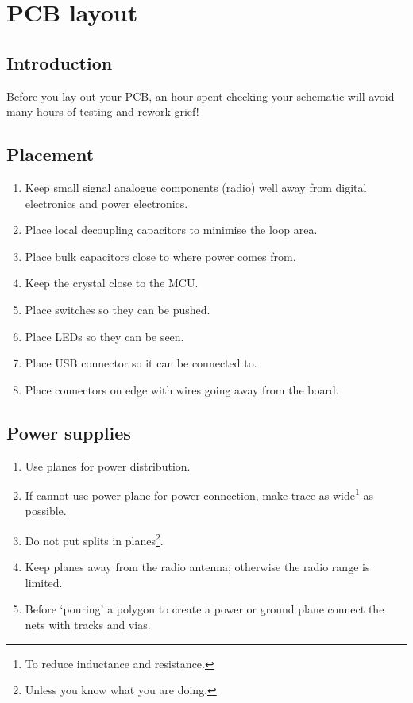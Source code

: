 \chapter{PCB layout}


\section{Introduction}
\label{PCB_introduction}

Before you lay out your PCB, an hour spent checking your schematic
will avoid many hours of testing and rework grief!


\label{pcb-recommendations}

\section{Placement}
\label{placement}

\begin{enumerate}
\item
  Keep small signal analogue components (radio) well away from digital
  electronics and power electronics.
\item
  Place local decoupling capacitors to minimise the loop area.
\item
  Place bulk capacitors close to where power comes from.
\item
  Keep the crystal close to the MCU.
\item
  Place switches so they can be pushed.
\item
  Place LEDs so they can be seen.
\item
  Place USB connector so it can be connected to.
\item
  Place connectors on edge with wires going away from the board.
\end{enumerate}


\section{Power supplies}

\begin{enumerate}
  
\item Use planes for power distribution.

\item If cannot use power plane for power connection, make trace as
  wide\footnote{To reduce inductance and resistance.} as possible.

\item Do not put splits in planes\footnote{Unless you know what you
  are doing.}.

\item Keep planes away from the radio antenna; otherwise the radio
  range is limited.

\item Before `pouring' a polygon to create a power or ground plane
  connect the nets with tracks and vias.
\end{enumerate}


